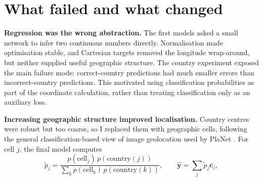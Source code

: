 \documentclass[10pt]{article}
\begin{document}
\section*{What failed and what changed}

\textbf{Regression was the wrong abstraction.}
The first models asked a small network to infer two continuous numbers directly.
Normalisation made optimisation stable, and Cartesian targets removed the
longitude wrap-around, but neither supplied useful geographic structure. The
country experiment exposed the main failure mode: correct-country predictions
had much smaller errors than incorrect-country predictions. This motivated
using classification probabilities as part of the coordinate calculation,
rather than treating classification only as an auxiliary loss.

\textbf{Increasing geographic structure improved localisation.}
Country centres were robust but too coarse, so I replaced them with geographic
cells, following the general classification-based view of image geolocation
used by PlaNet \cite{planet}. For cell $j$, the final model computes
\[
\tilde p_j =
\frac{p(\mathrm{cell}_j)\,p(\mathrm{country}(j))}
{\sum_k p(\mathrm{cell}_k)\,p(\mathrm{country}(k))},
\qquad
\hat{\mathbf y}=\sum_j \tilde p_j\mathbf c_j,
\]
\end{document}

